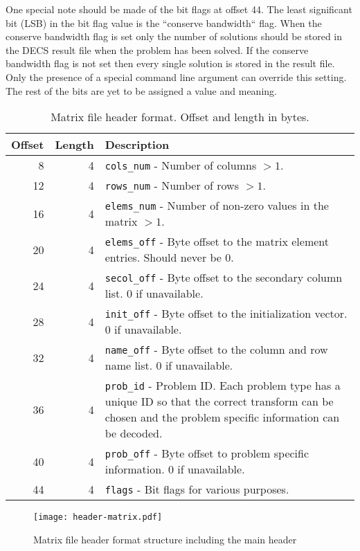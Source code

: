 One special note should be made of the bit flags at offset 44.
The least significant bit (LSB) in the bit flag value is the ``conserve bandwidth`` flag.
When the conserve bandwidth flag is set only the number of solutions should be stored in the DECS result file when the problem has been solved.
If the conserve bandwidth flag is not set then every single solution is stored in the result file.
Only the presence of a special command line argument can override this setting.
The rest of the bits are yet to be assigned a value and meaning.

\begin{table}[htbp]
	\centering
	\begin{tabular}{|r|r|p{3.2in}|}
		\hline
		\bf Offset & \bf Length & \bf Description \\ \hline
		8  & 4 & \texttt{cols\_num} - Number of columns $> 1$. \\ \hline
		12 & 4 & \texttt{rows\_num} - Number of rows $> 1$. \\ \hline
		16 & 4 & \texttt{elems\_num} - Number of non-zero values in the matrix $> 1$. \\ \hline
		20 & 4 & \texttt{elems\_off} - Byte offset to the matrix element entries. Should never be 0. \\ \hline
		24 & 4 & \texttt{secol\_off} - Byte offset to the secondary column list. 0 if unavailable. \\ \hline
		28 & 4 & \texttt{init\_off} -  Byte offset to the initialization vector. 0 if unavailable. \\ \hline
		32 & 4 & \texttt{name\_off} - Byte offset to the column and row name list. 0 if unavailable. \\ \hline
		36 & 4 & \texttt{prob\_id} - Problem ID. Each problem type has a unique ID so that the correct transform can be chosen and the problem specific information can be decoded. \\ \hline
		40 & 4 & \texttt{prob\_off} - Byte offset to problem specific information. 0 if unavailable. \\ \hline
		44 & 4 & \texttt{flags} - Bit flags for various purposes. \\ \hline
	\end{tabular}
	\caption{Matrix file header format. Offset and length in bytes.}
	\label{tab:header-matrix}
\end{table}

\begin{figure}[htbp]
	\centering
	\texttt{[image: header-matrix.pdf]}
	\caption{Matrix file header format structure including the main header}
	\label{fig:header-matrix}
\end{figure}


